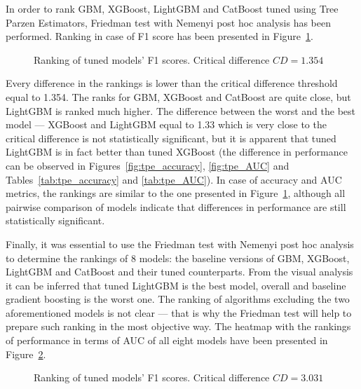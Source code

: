 \documentclass[magisterska, english]{pwr_wmat_praca_dyplomowa}
\theoremstyle{plain}
\numberwithin{theorem}{chapter}
\theoremstyle{definition}
\numberwithin{theorem}{chapter}
\begin{document}
In order to rank GBM, XGBoost, LightGBM and CatBoost tuned using Tree Parzen Estimators, Friedman test with Nemenyi post hoc analysis has been performed. Ranking in case of F1 score has been presented in Figure~\ref{fig:tpe_F1_heatmap}.

\begin{figure}[H]
	\centering
	\caption{Ranking of tuned models' F1 scores. Critical difference $CD = 1.354$}
	\label{fig:tpe_F1_heatmap}
\end{figure}

Every difference in the rankings is lower than the critical difference threshold equal to 1.354. The ranks for GBM, XGBoost and CatBoost are quite close, but LightGBM is ranked much higher. The difference between the worst and the best model --- XGBoost and LightGBM equal to 1.33 which is very close to the critical difference is not statistically significant, but it is apparent that tuned LightGBM is in fact better than tuned XGBoost (the difference in performance can be observed in Figures~\ref{fig:tpe_accuracy}, \ref{fig:tpe_AUC} and Tables~\ref{tab:tpe_accuracy} and \ref{tab:tpe_AUC}). In case of accuracy and AUC metrics, the rankings are similar to the one presented in Figure~\ref{fig:tpe_F1_heatmap}, although all pairwise comparison of models indicate that differences in performance are still statistically significant.

Finally, it was essential to use the Friedman test with Nemenyi post hoc analysis to determine the rankings of 8 models: the baseline versions of GBM, XGBoost, LightGBM and CatBoost and their tuned counterparts. From the visual analysis it can be inferred that tuned LightGBM is the best model, overall and baseline gradient boosting is the worst one. The ranking of algorithms excluding the two aforementioned models is not clear --- that is why the Friedman test will help to prepare such ranking in the most objective way. The heatmap with the rankings of performance in terms of AUC of all eight models have been presented in Figure~\ref{fig:no_tuning_tpe_AUC_heatmap}.

\begin{figure}[H]
	\centering
	\caption{Ranking of tuned models' F1 scores. Critical difference $CD = 3.031$}
	\label{fig:no_tuning_tpe_AUC_heatmap}
\end{figure}
\end{document}
